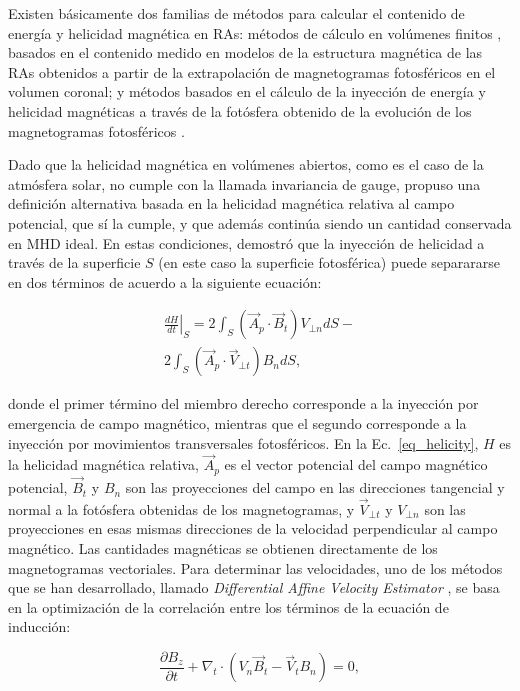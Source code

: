 \documentclass[baaa]{baaa}
\begin{document}
Existen básicamente dos familias de métodos para calcular el contenido de energía y helicidad magnética en RAs: métodos de cálculo en volúmenes finitos \citep{valori2016}, basados en el contenido medido en modelos de la estructura magnética de las RAs obtenidos a partir de la extrapolación de magnetogramas fotosféricos en el volumen coronal; y métodos basados en el cálculo de la inyección de energía y helicidad magnéticas a través de la fotósfera obtenido de la evolución de los magnetogramas fotosféricos \citep{pariat2005,liu2012}.

Dado que la helicidad magnética en volúmenes abiertos, como es el caso de la atmósfera solar, no cumple con la llamada invariancia de gauge, \citet{berger1984} propuso una definición alternativa basada en la helicidad magnética relativa al campo potencial, que sí la cumple, y que además continúa siendo un cantidad conservada en MHD ideal. En estas condiciones, \citet{berger1984} demostró que la inyección de helicidad a través de la superficie $S$ (en este caso la superficie fotosférica) puede separararse en dos términos de acuerdo a la siguiente ecuación:

\begin{eqnarray}
\label{eq_helicity}
\left.\frac{dH}{dt}\right|_{S} = 2 \int_{S}\left(\vec{A}_{p} \cdot \vec{B}_{t}\right)V_{\bot n}dS -
\\ \nonumber
2 \int_{S}\left(\vec{A}_{p}\cdot\vec{V}_{\bot t}\right)B_{n} dS,
\end{eqnarray}

\noindent donde el primer término del miembro derecho corresponde a la inyección por emergencia de campo magnético, mientras que el segundo corresponde a la inyección por movimientos transversales fotosféricos. En la Ec.~\ref{eq_helicity}, $H$ es la helicidad magnética relativa, $\vec{A}_p$ es el vector potencial del campo magnético potencial, $\vec{B}_{t}$ y $B_{n}$ son las proyecciones del campo en las direcciones tangencial y normal a la fotósfera obtenidas de los magnetogramas, y $\vec{V}_{\bot t}$ y $V_{\bot n}$ son las proyecciones en esas mismas direcciones de la velocidad perpendicular al campo magnético. Las cantidades magnéticas se obtienen directamente de los magnetogramas vectoriales. Para determinar las velocidades, uno de los métodos que se han desarrollado, llamado {\sl Differential Affine Velocity Estimator} \citep[{\sl DAVE4VM},][]{schuck2008}, se basa en la optimización de la correlación entre los términos de la ecuación de inducción:

\begin{equation}
\label{eq_induction}
\frac{\partial B_z}{\partial t} + \nabla_t \cdot \left(V_n \vec{B}_t - \vec{V}_t B_n \right) = 0,
\end{equation}
\end{document}

